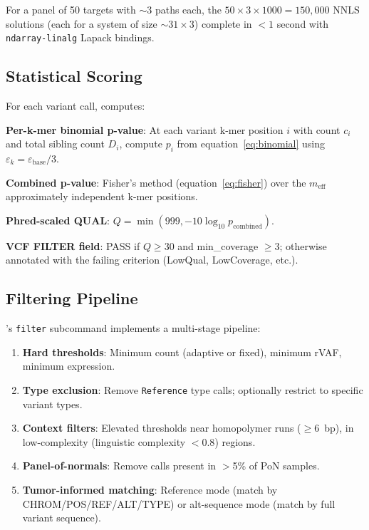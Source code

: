 For a panel of 50 targets with $\sim$3 paths each, the $50 \times 3 \times 1000 =
150{,}000$ NNLS solutions (each for a system of size $\sim 31 \times 3$) complete
in $<1$ second with \texttt{ndarray-linalg} Lapack bindings.

\subsection{Statistical Scoring}
\label{sec:scoring}

For each variant call, \kmerdet{} computes:

\textbf{Per-k-mer binomial p-value}: At each variant k-mer position $i$ with
count $c_i$ and total sibling count $D_i$, compute $p_i$ from
equation~\eqref{eq:binomial} using $\varepsilon_k = \varepsilon_{\text{base}} / 3$.

\textbf{Combined p-value}: Fisher's method (equation~\eqref{eq:fisher}) over
the $m_{\text{eff}}$ approximately independent k-mer positions.

\textbf{Phred-scaled QUAL}: $Q = \min(999, -10 \log_{10} p_{\text{combined}})$.

\textbf{VCF FILTER field}: PASS if $Q \geq 30$ and min\_coverage $\geq 3$;
otherwise annotated with the failing criterion (LowQual, LowCoverage, etc.).

\subsection{Filtering Pipeline}
\label{sec:filtering}

\kmerdet{}'s \texttt{filter} subcommand implements a multi-stage pipeline:

\begin{enumerate}
  \item \textbf{Hard thresholds}: Minimum count (adaptive or fixed), minimum
    rVAF, minimum expression.
  \item \textbf{Type exclusion}: Remove \texttt{Reference} type calls; optionally
    restrict to specific variant types.
  \item \textbf{Context filters}: Elevated thresholds near homopolymer runs
    ($\geq 6$~bp), in low-complexity (linguistic complexity $< 0.8$) regions.
  \item \textbf{Panel-of-normals}: Remove calls present in $>$5\% of PoN
    samples.
  \item \textbf{Tumor-informed matching}: Reference mode (match by
    CHROM/POS/REF/ALT/TYPE) or alt-sequence mode (match by full variant sequence).
\end{enumerate}

